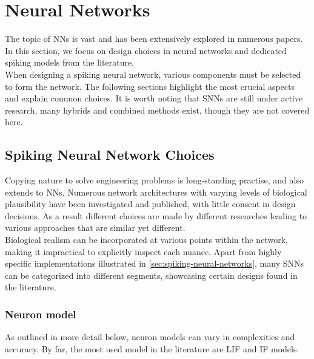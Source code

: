 \section{Neural Networks}
The topic of \acp{NN} is vast and has been extensively explored in numerous papers. In this section, we focus on design choices in neural networks and dedicated spiking models from the literature.\\
When designing a spiking neural network, various components must be selected to form the network. The following sections highlight the most crucial aspects and explain common choices. It is worth noting that \acp{SNN} are still under active research, many hybrids and combined methods exist, though they are not covered here.\\
\subsection{Spiking Neural Network Choices}

Copying nature to solve engineering problems is long-standing practise, and also extends to \acp{NN}. Numerous network architectures with varying levels of biological plausibility have been investigated and published, with little consent in design decisions. As a result different choices are made by different researches leading to various approaches that are similar yet different.\\
Biological realism can be incorporated at various points within the network, making it impractical to explicitly inspect each nuance. Apart from highly specific implementations illustrated in \cref{sec:spiking-neural-networks}, many \acp{SNN} can be categorized into different segments, showcasing certain designs found in the literature.\\
\subsubsection{Neuron model}
As outlined in more detail below, neuron models can vary in complexities and accuracy. By far, the most used model in the literature are \ac{LIF} and \ac{IF} models.\\

